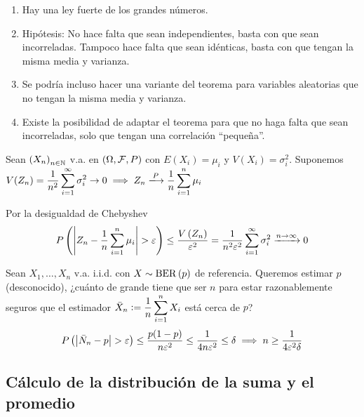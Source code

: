 \begin{obs}
	\begin{enumerate}
		\item Hay una ley fuerte de los grandes números.
		\item Hipótesis: No hace falta que sean independientes, basta con que sean incorreladas. Tampoco hace falta que sean idénticas, basta con que tengan la misma media y varianza.
		\item Se podría incluso hacer una variante del teorema para variables aleatorias que no tengan la misma media y varianza.
		\item Existe la posibilidad de adaptar el teorema para que no haga falta que sean incorreladas, solo que tengan una correlación ``pequeña''.
	\end{enumerate}
\end{obs}

\begin{teo}
	Sean $\left(X_n\right)_{n\in \mathbb{N}}$ v.a. en $(\Omega, \mathcal{F}, P)$ con $E(X_i) = \mu_i$ y $V(X_i) = \sigma_i^2$. Suponemos $\ds V(Z_n) = \frac{1}{n^2}\sum_{i=1}^{\infty} \sigma_i^2 \to 0 \implies Z_n \xlongrightarrow{P} \frac{1}{n} \sum_{i=1}^{n} \mu_i$
	\begin{dem} Por la desigualdad de Chebyshev
		\[P\left(\left|Z_n - \frac{1}{n} \sum_{i=1}^{n} \mu_i\right| > \varepsilon \right) \leq \frac{V\left(Z_n\right)}{\varepsilon^2} = \frac{1}{n^2\varepsilon^2}\sum_{i=1}^{\infty} \sigma_i^2 \xrightarrow{n\to\infty} 0\]
	\end{dem}
\end{teo}

 Sean $X_1, \ldots, X_n$ v.a. i.i.d. con $X\sim \operatorname{BER}\left(p\right)$ de referencia. Queremos estimar $p$ (desconocido), ¿cuánto de grande tiene que ser $n$ para estar razonablemente seguros que el estimador $\displaystyle \Bar{X}_n \vcentcolon= \frac{1}{n}\sum_{i=1}^{n} X_i$ está cerca de $p$?
\[P\left(\left|\Bar{N}_n - p\right| > \varepsilon\right) \leq \frac{p(1-p)}{n\varepsilon^2} \leq \frac{1}{4n\varepsilon^2} \leq \delta \implies n \geq \frac{1}{4\varepsilon^2\delta}\]

\subsection{Cálculo de la distribución de la suma y el promedio}

